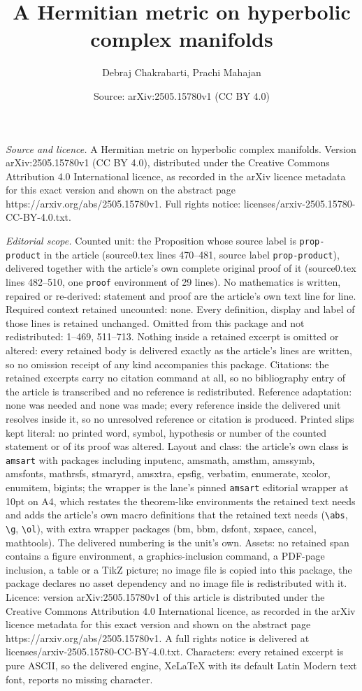 \documentclass[10pt,a4paper]{amsart}
\title[A Hermitian metric on hyperbolic complex manifolds]{A Hermitian metric on hyperbolic complex manifolds}
\author{Debraj Chakrabarti, Prachi Mahajan}
\date{Source: arXiv:2505.15780v1 (CC BY 4.0)}
\begin{document}
\maketitle

\noindent\emph{Source and licence.} A Hermitian metric on hyperbolic complex manifolds. Version arXiv:2505.15780v1 (CC BY 4.0), distributed under the Creative Commons Attribution 4.0 International licence, as recorded in the arXiv licence metadata for this exact version and shown on the abstract page https://arxiv.org/abs/2505.15780v1. Full rights notice: licenses/arxiv-2505.15780-CC-BY-4.0.txt.\par\smallskip

\noindent\textit{Editorial scope.} Counted unit: the Proposition whose source label is \texttt{prop-product} in the article (source0.tex lines 470--481, source label \texttt{prop-product}), delivered together with the article's own complete original proof of it (source0.tex lines 482--510, one \texttt{proof} environment of 29 lines). No mathematics is written, repaired or re-derived: statement and proof are the article's own text line for line. Required context retained uncounted: none. Every definition, display and label of those lines is retained unchanged. Omitted from this package and not redistributed: 1--469, 511--713. Nothing inside a retained excerpt is omitted or altered: every retained body is delivered exactly as the article's lines are written, so no omission receipt of any kind accompanies this package. Citations: the retained excerpts carry no citation command at all, so no bibliography entry of the article is transcribed and no reference is redistributed. Reference adaptation: none was needed and none was made; every reference inside the delivered unit resolves inside it, so no unresolved reference or citation is produced. Printed slips kept literal: no printed word, symbol, hypothesis or number of the counted statement or of its proof was altered. Layout and class: the article's own class is \texttt{amsart} with packages including inputenc, amsmath, amsthm, amssymb, amsfonts, mathrsfs, stmaryrd, amsxtra, epsfig, verbatim, enumerate, xcolor, enumitem, bigints; the wrapper is the lane's pinned \texttt{amsart} editorial wrapper at 10pt on A4, which restates the theorem-like environments the retained text needs and adds the article's own macro definitions that the retained text needs (\texttt{\textbackslash abs}, \texttt{\textbackslash g}, \texttt{\textbackslash ol}), with extra wrapper packages (bm, bbm, dsfont, xspace, cancel, mathtools). The delivered numbering is the unit's own. Assets: no retained span contains a figure environment, a graphics-inclusion command, a PDF-page inclusion, a table or a TikZ picture; no image file is copied into this package, the package declares no asset dependency and no image file is redistributed with it. Licence: version arXiv:2505.15780v1 of this article is distributed under the Creative Commons Attribution 4.0 International licence, as recorded in the arXiv licence metadata for this exact version and shown on the abstract page https://arxiv.org/abs/2505.15780v1. A full rights notice is delivered at licenses/arxiv-2505.15780-CC-BY-4.0.txt. Characters: every retained excerpt is pure ASCII, so the delivered engine, XeLaTeX with its default Latin Modern text font, reports no missing character.
\end{document}

